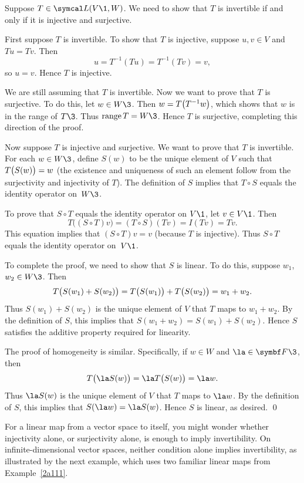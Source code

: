 
\proof
Suppose $T\in \L(V\1,W)$.  We need to show that $T$ is
invertible if  and only if it is injective and surjective.

First suppose $T$ is invertible.  To show that $T$ is injective, suppose
$u, v \in V$ and $Tu = Tv$.  Then
\[
u = T^{-1}(Tu) = T^{-1}(Tv) = v,
\]
so $u = v$.  Hence $T$ is injective.

We are still assuming that $T$ is invertible.  Now we want to prove that $T$ is
surjective.  To do this, let $w \in W\3$.  Then $w = T\paren[\big]{T^{-1}w}$, which shows that
$w$ is in the range of $T\3$.  Thus $\ran T = W\3$. Hence $T$ is surjective,
completing this direction of the proof.

Now suppose $T$ is injective and surjective.  We want to prove that $T$ is
invertible.  For each $w \in W\3$, define $S(w)$ to be the unique element of $V$ such
that $T\paren[\big]{S(w)} = w$ (the existence and uniqueness of such an element follow from
the surjectivity and injectivity of $T$). The definition of $S$ implies that $T \circ S$ equals the identity operator
on~$W\3$.

To prove that $S \circ T$ equals the identity operator on $V\1$, let $v \in V\1$.  Then
\[
T\bigl((S \circ T)v \bigr) = (T \circ S)(Tv) = I(Tv) = Tv.
\]
This equation implies that $(S \circ T)v = v$ (because $T$ is injective). Thus $S \circ T$
equals the identity operator on~$V\1$.

To complete the proof, we need to show that
$S$ is linear.  To do this, suppose $w_1$, $w_2 \in W\3$.  Then
\[
T\paren[\big]{S(w_1) + S(w_2)} = T\paren[\big]{S(w_1)} + T\paren[\big]{S(w_2)} = w_1 + w_2.
\]
Thus $S(w_1) + S(w_2)$ is the unique element of $V$ that $T$ maps to
$w_1 + w_2$.  By the definition of $S$, this implies that $S(w_1 + w_2) = S(w_1) + S(w_2)$.  Hence $S$ satisfies the additive property required for linearity.

The proof of homogeneity is similar.  Specifically, if $w \in W$ and $\la \in \F{}\3$, then
\[
T\paren[\big]{\la S(w)} = \la T\paren[\big]{S(w)} = \la w.
\]
Thus $\la S(w)$ is the unique element of $V$ that $T$ maps to $\la w$.  By the
definition of $S$, this implies that $S(\la w) = \la S(w)$.  Hence $S$ is
linear, as desired.
\qed

For a linear map from a vector space to itself, you might wonder whether injectivity alone, or surjectivity alone, is enough to imply invertibility.  On infinite-dimensional vector spaces, neither condition alone implies invertibility, as illustrated by the next example, which uses two familiar linear maps from Example~\ref{2a111}.

